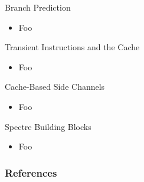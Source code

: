\documentclass[12pt, dvipsnames, aspectratio=169]{beamer}
\begin{document}
\begin{frame}[c]{Branch Prediction}
  \begin{itemize}
    \item Foo
  \end{itemize}
\end{frame}

\begin{frame}[c]{Transient Instructions and the Cache}
  \begin{itemize}
    \item Foo
  \end{itemize}
\end{frame}

\begin{frame}[c]{Cache-Based Side Channels}
  \begin{itemize}
    \item Foo
  \end{itemize}
\end{frame}

\begin{frame}[c]{Spectre Building Blocks}
  \begin{itemize}
    \item Foo
  \end{itemize}
\end{frame}

\appendix

\nocite{*}
\begin{frame}
  \frametitle{References}
  \printbibliography
\end{frame}
\end{document}
